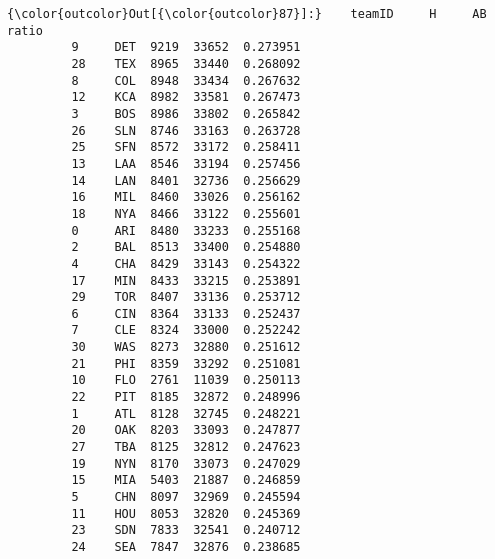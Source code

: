\documentclass[11pt]{article}
\begin{document}
\begin{Verbatim}[commandchars=\\\{\}]
{\color{outcolor}Out[{\color{outcolor}87}]:}    teamID     H     AB     ratio
         9     DET  9219  33652  0.273951
         28    TEX  8965  33440  0.268092
         8     COL  8948  33434  0.267632
         12    KCA  8982  33581  0.267473
         3     BOS  8986  33802  0.265842
         26    SLN  8746  33163  0.263728
         25    SFN  8572  33172  0.258411
         13    LAA  8546  33194  0.257456
         14    LAN  8401  32736  0.256629
         16    MIL  8460  33026  0.256162
         18    NYA  8466  33122  0.255601
         0     ARI  8480  33233  0.255168
         2     BAL  8513  33400  0.254880
         4     CHA  8429  33143  0.254322
         17    MIN  8433  33215  0.253891
         29    TOR  8407  33136  0.253712
         6     CIN  8364  33133  0.252437
         7     CLE  8324  33000  0.252242
         30    WAS  8273  32880  0.251612
         21    PHI  8359  33292  0.251081
         10    FLO  2761  11039  0.250113
         22    PIT  8185  32872  0.248996
         1     ATL  8128  32745  0.248221
         20    OAK  8203  33093  0.247877
         27    TBA  8125  32812  0.247623
         19    NYN  8170  33073  0.247029
         15    MIA  5403  21887  0.246859
         5     CHN  8097  32969  0.245594
         11    HOU  8053  32820  0.245369
         23    SDN  7833  32541  0.240712
         24    SEA  7847  32876  0.238685
\end{Verbatim}
            
\end{document}
